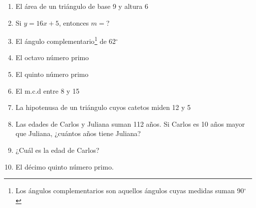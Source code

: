\documentclass[letterpaper,11pt,twoside]{article}
\begin{document}
\begin{multicols}{2}
\begin{enumerate}
\item El área de un triángulo de base 9 y altura 6
\item Si $y=16x+5$, entonces $m=$?
\item El ángulo complementario\footnote{Los ángulos complementarios son aquellos ángulos cuyas medidas suman 90$^{\circ}$} de 62$^{\circ}$
\item El octavo número primo
\item El quinto número primo
\item El m.c.d entre 8 y 15
\item La hipotenusa de un triángulo cuyos catetos miden 12 y 5
\item Las edades de Carlos y Juliana suman 112 años. Si Carlos es 10 años mayor que Juliana, ¿cuántos años tiene Juliana?
\item ¿Cuál es la edad de Carlos?
\item El décimo quinto número primo.
\end{enumerate}
\end{multicols}
\newpage
\end{document}
